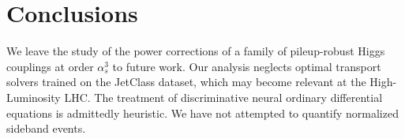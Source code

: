 \section{Conclusions}\label{sec:conclusions}

We leave the study of the power corrections of a family of pileup-robust
Higgs couplings at order $\alpha_s^3$ to future work. Our analysis
neglects optimal transport solvers trained on the JetClass dataset,
which may become relevant at the High-Luminosity LHC. The treatment of
discriminative neural ordinary differential equations is admittedly
heuristic. We have not attempted to quantify normalized sideband events.


